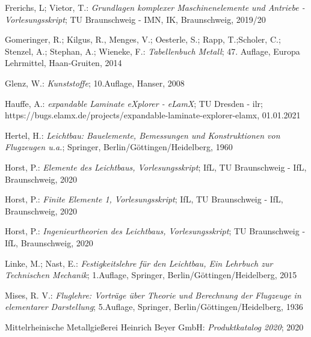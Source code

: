 \begingroup
\renewcommand{\section}[2]{}%
\begin{thebibliography}{99}  
	
	Frerichs, L; Vietor, T.:
	\textit{\glqq Grundlagen komplexer Maschinenelemente und Antriebe - Vorlesungsskript\grqq};
	TU Braunschweig - IMN, IK, Braunschweig, 2019/20
	
	Gomeringer, R.; Kilgus, R., Menges, V.; Oesterle, S.; Rapp, T.;Scholer, C.; Stenzel, A.; Stephan, A.; Wieneke, F.:
	\textit{\glqq Tabellenbuch Metall\grqq};
	47. Auflage, Europa Lehrmittel, Haan-Gruiten, 2014 
	
	Glenz, W.:
	\textit{\glqq Kunststoffe\grqq};
	10.Auflage, Hanser, 2008
	
	Hauffe, A.:
	\textit{\glqq expandable Laminate eXplorer - eLamX\grqq};
	TU Dresden - ilr; https://bugs.elamx.de/projects/expandable-laminate-explorer-elamx, 01.01.2021
	
	Hertel, H.:
	\textit{\glqq Leichtbau: Bauelemente, Bemessungen und Konstruktionen von Flugzeugen u.a.\grqq};
	Springer, Berlin/Göttingen/Heidelberg, 1960 
	
	Horst, P.:
	\textit{\glqq Elemente des Leichtbaus, Vorlesungsskript\grqq};
	IfL, TU Braunschweig - IfL, Braunschweig, 2020 
	
	Horst, P.:
	\textit{\glqq Finite Elemente 1, Vorlesungsskript\grqq};
	IfL, TU Braunschweig  - IfL, Braunschweig, 2020 
	
	Horst, P.:
	\textit{\glqq Ingenieurtheorien des Leichtbaus, Vorlesungsskript\grqq};
	 TU Braunschweig - IfL, Braunschweig, 2020 
	
	Linke, M.; Nast, E.:
	\textit{\glqq Festigkeitslehre für den Leichtbau, Ein Lehrbuch zur Technischen Mechanik\grqq};
	1.Auflage, Springer, Berlin/Göttingen/Heidelberg, 2015
	
	Mises, R. V.:
	\textit{\glqq Fluglehre: Vorträge über Theorie und Berechnung der Flugzeuge in elementarer Darstellung\grqq};
	5.Auflage, Springer, Berlin/Göttingen/Heidelberg, 1936
	
	Mittelrheinische Metallgießerei Heinrich Beyer GmbH:
	\textit{\glqq Produktkatalog 2020\grqq}; 2020
	

\end{thebibliography}
